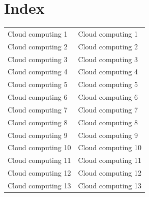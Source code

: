 \setcounter{equation}{0}
\thispagestyle{plain}
\renewcommand{\chaptermark}[1]{ \markboth{#1}{} }
\renewcommand{\sectionmark}[1]{ \markright{#1} }
\renewcommand{\headrulewidth}{0.4pt} %
\renewcommand{\footrulewidth}{0.4pt}
\fancyfoot[RO,LE]{\thepage}

\chapter*{Index}
\begin{table}[]
	\begin{tabular}{ll}
		Cloud computing 1  & Cloud computing 1  \\
		Cloud computing 2  & Cloud computing 2  \\
		Cloud computing 3  & Cloud computing 3  \\
		Cloud computing 4  & Cloud computing 4  \\
		Cloud computing 5  & Cloud computing 5  \\
		Cloud computing 6  & Cloud computing 6  \\
		Cloud computing 7  & Cloud computing 7  \\
		Cloud computing 8  & Cloud computing 8  \\
		Cloud computing 9  & Cloud computing 9  \\
		Cloud computing 10 & Cloud computing 10 \\
		Cloud computing 11 & Cloud computing 11 \\
		Cloud computing 12 & Cloud computing 12 \\
		Cloud computing 13 & Cloud computing 13
	\end{tabular}
\end{table}